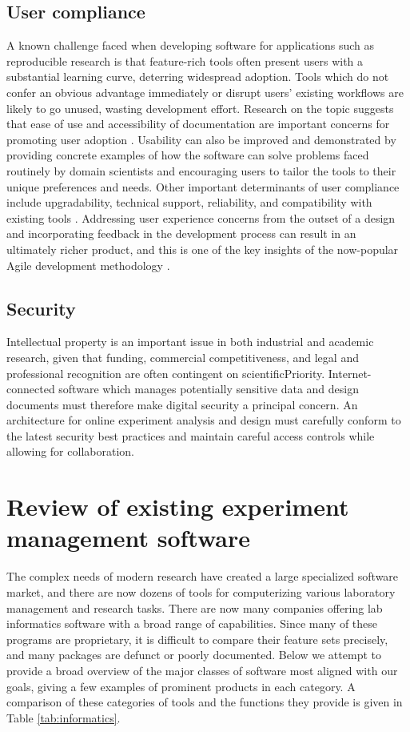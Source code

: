 \documentclass[../thesis]{subfiles}
\begin{document}
\subsection{User compliance}
A known challenge faced when developing software for applications such
as reproducible research is that feature-rich tools often present users
with a substantial learning curve, deterring widespread
adoption. Tools which do not confer an obvious
advantage immediately or disrupt users' existing workflows are likely
to go unused, wasting development effort. Research on the topic
suggests that ease of use and accessibility of documentation are
important concerns for promoting user adoption
\cite{Lederer2000}. Usability can also be improved and demonstrated by
providing concrete examples of how the software can solve problems
faced routinely by domain scientists and encouraging users to tailor
the tools to their unique preferences and needs. Other important
determinants of user compliance include upgradability, technical
support, reliability, and compatibility with existing tools
\cite{wang2001open}. Addressing user experience concerns from the
outset of a design and incorporating feedback in the development
process can result in an ultimately richer product, and this is one of
the key insights of the now-popular Agile development methodology
\cite{begel2007usage}.

\subsection{Security}
Intellectual property is an important issue in both industrial and
academic research, given that funding, commercial competitiveness, and
legal and professional recognition are often contingent on
\gls{scientificPriority}. Internet-connected software which manages
potentially sensitive data and design documents must therefore make
digital security a principal concern. An architecture for online
experiment analysis and design must carefully conform to the latest
security best practices and maintain careful access controls while
allowing for collaboration.

\section{Review of existing experiment management \mbox{software}}

The complex needs of modern research have created a large specialized
software market, and there are now dozens of tools for computerizing
various laboratory management and research tasks. There are now many
companies offering lab informatics software with a broad range of
capabilities. Since many of these programs are proprietary, it is
difficult to compare their feature sets precisely, and many
packages are defunct or poorly documented. Below we attempt to provide a
broad overview of the major classes of software most aligned with our
goals, giving a few examples of prominent products in each category.
A comparison of these categories of tools and the functions they
provide is given in Table \ref{tab:informatics}.
\end{document}
